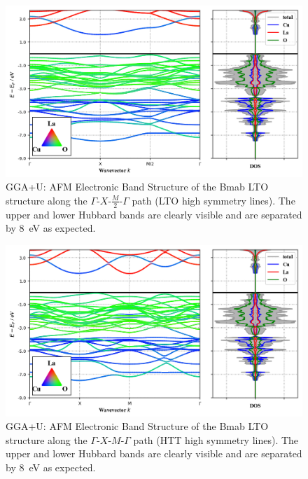 \begin{figure}
    \centering
    \includegraphics[width=\textwidth]{fig/simulation/bs_afm2.png}
    \caption[GGA+U: AFM Electronic Band Structure]{GGA+U: AFM Electronic Band Structure of the Bmab LTO structure along the $\Gamma$-$X$-$\frac{M}{2}$-$\Gamma$ path (LTO high symmetry lines). The upper and lower Hubbard bands are clearly visible and are separated by \SI{8}{\eV} as expected.}
    \label{fig:bs_afm2}
\end{figure}

\begin{figure}
    \centering
    \includegraphics[width=\textwidth]{fig/simulation/bs_afm1.png}
    \caption[GGA+U: AFM Electronic Band Structure]{GGA+U: AFM Electronic Band Structure of the Bmab LTO structure along the $\Gamma$-$X$-$M$-$\Gamma$ path (HTT high symmetry lines). The upper and lower Hubbard bands are clearly visible and are separated by \SI{8}{\eV} as expected.}
    \label{fig:bs_afm1}
\end{figure}

